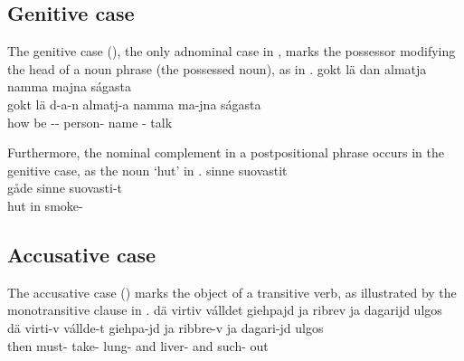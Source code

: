 \subsection{Genitive case}\label{genitive}
The genitive case (\GENs), the only adnominal case in \PS, %
marks the possessor modifying the head of a noun phrase (the possessed noun), as in . 
\ea\label{gen1}
\glll	gokt lä {dan} {almatja} namma majna ságasta\\ %
	gokt lä d-a-n almatj-a namma ma-jna ságasta\\
	how be\BS{} -- person- name\BS{} - talk\BS{}\\\nopagebreak
{} 
\z

Furthermore, the nominal complement in a postpositional phrase occurs in the genitive case, as the noun  ‘hut’ in .
\ea\label{gen2}
 sinne suovastit\\ %
	gåde sinne suovasti-t\\
	hut\BS{} in smoke-\\\nopagebreak
{} 
\z


\subsection{Accusative case}\label{accusative}
The accusative case (\ACCs) marks the object of a transitive verb, as illustrated by the monotransitive clause in .  
\ea\label{acc1}
\glll	dä virtiv válldet {giehpajd} ja {ribrev} ja {dagarijd} ulgos\\ %
	dä virti-v vállde-t giehpa-jd ja ribbre-v ja dagari-jd ulgos\\
	then must- take- lung- and liver- and such- out\\\nopagebreak
{} 
\z

